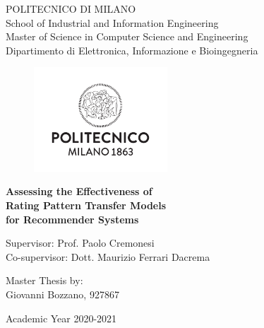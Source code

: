 \thispagestyle{empty}
\vspace*{-1.5cm} \bfseries{
\begin{center}
	\LARGE
	POLITECNICO DI MILANO\\
	\vspace*{0.3cm}
	\normalsize
	School of Industrial and Information Engineering\\
	Master of Science in Computer Science and Engineering\\
	Dipartimento di Elettronica, Informazione e Bioingegneria\\
	\vspace*{0.8cm}
	\begin{figure}[htbp]
		\begin{center}
			\includegraphics[width=5cm]{pictures/logo}
		\end{center}
	\end{figure}
	\vspace*{0.3cm} \LARGE
	\textbf{Assessing the Effectiveness of\\Rating Pattern Transfer Models\\for Recommender Systems}\\
	\vspace*{.75truecm} \large
\end{center}
\vspace*{2.0cm} \large
\begin{flushleft}
	Supervisor: Prof. Paolo Cremonesi\\
	Co-supervisor: Dott. Maurizio Ferrari Dacrema\\
\end{flushleft}
\vspace*{1.0cm}
\begin{flushright}
	Master Thesis by:\\
	Giovanni Bozzano, 927867\\
\end{flushright}
\vspace*{1.0cm}
\begin{center}
	Academic Year 2020-2021
\end{center} \clearpage
}
